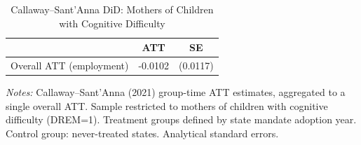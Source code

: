 \begin{table}[H]
\centering
\caption{Callaway--Sant'Anna DiD: Mothers of Children with Cognitive Difficulty}
\begin{threeparttable}
\begin{tabular}{lcc}
\toprule
 & ATT & SE \\
\midrule
Overall ATT (employment) & -0.0102 & (0.0117) \\
\bottomrule
\end{tabular}
\begin{tablenotes}[flushleft]
\small
\item \textit{Notes:} Callaway--Sant'Anna (2021) group-time ATT estimates, aggregated to a single overall ATT. Sample restricted to mothers of children with cognitive difficulty (DREM=1). Treatment groups defined by state mandate adoption year. Control group: never-treated states. Analytical standard errors.
\end{tablenotes}
\end{threeparttable}
\label{tab:cs}
\end{table}

